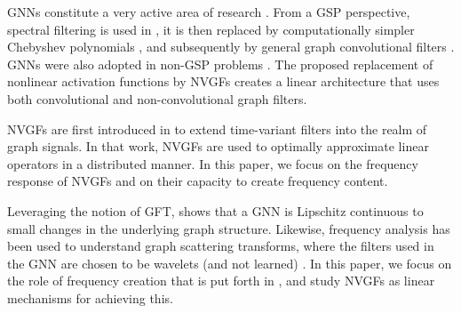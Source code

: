 

 GNNs constitute a very active area of research \cite{Rey2019-EncoderDecoder, Rey2021-Overparametrized}. From a GSP perspective, spectral filtering is used in \cite{Bruna2014-SpectralGNN}, it is then replaced by computationally simpler Chebyshev polynomials \cite{Defferrard2016-ChebNets}, and subsequently by general graph convolutional filters \cite{Gama2019-Archit}. GNNs were also adopted in non-GSP problems \cite{Kipf2017-GCN, Weinberger2019-SGC, Velickovic2018-GAT}. The proposed replacement of nonlinear activation functions by NVGFs creates a linear architecture that uses both convolutional and non-convolutional graph filters.

NVGFs are first introduced in \cite{Segarra2017-GraphFilterDesign} to extend time-variant filters into the realm of graph signals. In that work, NVGFs are used to optimally approximate linear operators in a distributed manner. In this paper, we focus on the frequency response of NVGFs and on their capacity to create frequency content.

Leveraging the notion of GFT, \cite{Gama2020-Stability} shows that a GNN is Lipschitz continuous to small changes in the underlying graph structure. Likewise, frequency analysis has been used to understand graph scattering transforms, where the filters used in the GNN are chosen to be wavelets (and not learned) \cite{Wolf2019-GeometricScattering, Lerman2020-Scattering}.
In this paper, we focus on the role of frequency creation that is put forth in \cite{Mallat2012-Scattering, Gama2020-Stability}, and study NVGFs as linear mechanisms for achieving this.